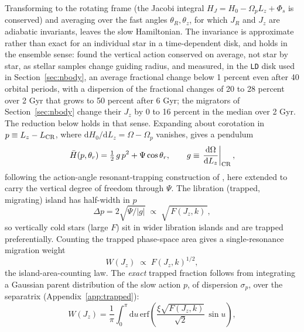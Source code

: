 \documentclass[twocolumn]{aastex701}
\newcommand{\Jz}{J_z}
\newcommand{\Lz}{L_z}
\newcommand{\JR}{J_R}
\begin{document}
Transforming to the rotating frame (the Jacobi integral $H_J=H_0-\Omega_p\Lz+
\Phi_s$ is conserved) and averaging over the fast angles $\theta_R,\theta_z$, for
which $\JR$ and $\Jz$ are adiabatic invariants, leaves the slow Hamiltonian. The
invariance is approximate rather than exact for an individual star in a
time-dependent disk, and holds in the ensemble sense: \citet{Minchev2012thickening}
found the vertical action conserved on average, not star by star, as stellar samples
change guiding radius, and \citet{VeraCiro2016conservation} measured, in the
\texttt{LD} disk used in Section~\ref{sec:nbody}, an average fractional change below 1
percent even after 40 orbital periods, with a dispersion of the fractional changes of
20 to 28 percent over 2 Gyr that grows to 50 percent after 6 Gyr; the migrators of
Section~\ref{sec:nbody} change their $\Jz$ by 0 to 16 percent in the median over 2
Gyr. The reduction below holds in that sense. Expanding
about corotation in $p\equiv\Lz-L_{\rm CR}$, where $\mathrm{d}H_0/\mathrm{d}\Lz=
\Omega-\Omega_p$ vanishes, gives a pendulum
%
\begin{equation}
  \bar H(p,\theta_r) = \tfrac{1}{2}\,g\,p^2 + \Psi\cos\theta_r,
  \qquad g\equiv\left.\frac{\mathrm{d}\Omega}{\mathrm{d}\Lz}\right|_{\rm CR},
  \label{eq:pendulum}
\end{equation}
%
following the action-angle resonant-trapping construction of \citet{Monari2017},
here extended to carry the vertical degree of freedom through $\Psi$. The libration
(trapped, migrating) island has half-width in $p$
%
\begin{equation}
  \Delta p = 2\sqrt{\Psi/|g|} \;\propto\; \sqrt{\,F(\Jz,k)\,},
  \label{eq:width}
\end{equation}
%
so vertically cold stars (large $F$) sit in wider libration islands and are trapped
preferentially. Counting the trapped phase-space area gives a single-resonance
migration weight
%
\begin{equation}
  W(\Jz) \;\propto\; F(\Jz,k)^{1/2},
  \label{eq:wsqrtf}
\end{equation}
%
the island-area-counting law. The \emph{exact} trapped fraction follows from
integrating a Gaussian parent distribution of the slow action $p$, of dispersion
$\sigma_p$, over the separatrix (Appendix~\ref{app:trapped}):
%
\begin{equation}
  W(\Jz) = \frac{1}{\pi}\int_0^\pi \mathrm{d}u\,
  \mathrm{erf}\!\left(\frac{\xi\sqrt{F(\Jz,k)}}{\sqrt2}\,\sin u\right),
  \label{eq:wexact}
\end{equation}
\end{document}
